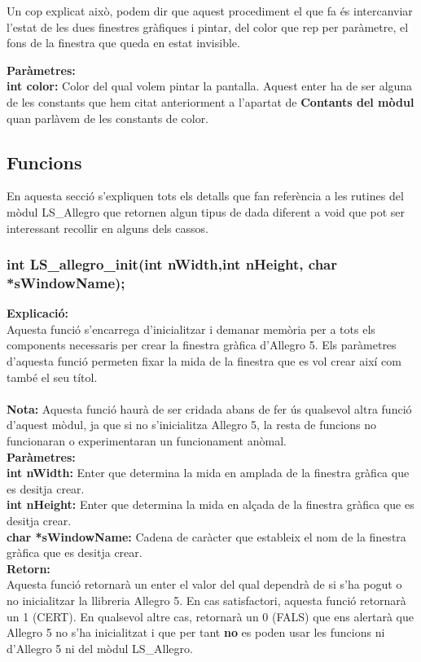 \documentclass[11pt]{article}
\begin{document}
\noindent Un cop explicat això, podem dir que aquest procediment el que fa és intercanviar l'estat de les dues finestres gràfiques i pintar, del color que rep per paràmetre, el fons de la finestra que queda en estat invisible.

\noindent \textbf{Paràmetres:} \\
\textbf{int color:} Color del qual volem pintar la pantalla. Aquest enter ha de ser alguna de les constants que hem citat anteriorment a l'apartat de \textbf{Contants del mòdul} quan parlàvem de les constants de color.

\subsection{Funcions}
En aquesta secció s'expliquen tots els detalls que fan referència a les rutines del mòdul LS\_Allegro que retornen algun tipus de dada diferent a void que pot ser interessant recollir en alguns dels cassos.

\subsubsection{int LS\_allegro\_init(int nWidth,int nHeight, char *sWindowName);}
\textbf{Explicació:}\\
Aquesta funció s'encarrega d'inicialitzar i demanar memòria per a tots els components necessaris per crear la finestra gràfica d'Allegro 5. Els paràmetres d'aquesta funció permeten fixar la mida de la finestra que es vol crear així com també el seu títol.\\\\
\textbf{Nota:} Aquesta funció haurà de ser cridada abans de fer ús qualsevol altra funció d'aquest mòdul, ja que si no s'inicialitza Allegro 5, la resta de funcions no funcionaran o experimentaran un funcionament anòmal.\\

\noindent \textbf{Paràmetres:}\\
\textbf{int nWidth:} Enter que determina la mida en amplada de la finestra gràfica que es desitja crear.\\
\textbf{int nHeight:} Enter que determina la mida en alçada de la finestra gràfica que es desitja crear.\\
\textbf{char *sWindowName: } Cadena de caràcter que estableix el nom de la finestra gràfica que es desitja crear.\\

\noindent \textbf{Retorn:}\\
Aquesta funció retornarà un enter el valor del qual dependrà de si s'ha pogut o no inicialitzar la llibreria Allegro 5. En cas satisfactori, aquesta funció retornarà un 1 (CERT). En qualsevol altre cas, retornarà un 0 (FALS) que ens alertarà que Allegro 5 no s'ha inicialitzat i que per tant \textbf{no} es poden usar les funcions ni d'Allegro 5 ni del mòdul LS\_Allegro.
\end{document}
